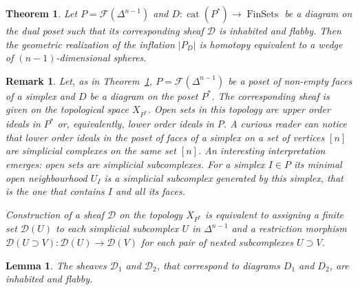 \documentclass[10pt,a4paper]{amsart}
\newtheorem{lem}{Lemma}
\newtheorem{thm}{Theorem}
\newtheorem{rem}{Remark}
\DeclareMathOperator{\FinSets}{FinSets}
\newcommand{\ca}[1]{\mathcal{#1}}
\DeclareMathOperator{\cat}{cat}
\begin{document}
\begin{thm}\label{thmSimplex}
Let $P=\ca{F}(\Delta^{n-1})$  and  $D\colon \cat(P^*)\to \FinSets$ be a diagram on the dual poset such that its corresponding sheaf $\ca{D}$ is inhabited  and  flabby. Then the geometric realization of the inflation $|P_D|$  is homotopy equivalent to a wedge of $(n-1)$-dimensional spheres.
\end{thm}

\begin{rem}\label{remOpenSubcomplexes}
Let, as in Theorem~\ref{thmSimplex}, $P=\ca{F}(\Delta^{n-1})$ be a poset of non-empty faces of a simplex  and  $D$ be a diagram on the poset $P^*$. The corresponding sheaf is given on the topological space $X_{P^*}$. Open sets in this topology are upper order ideals in $P^*$ or, equivalently, lower order ideals in $P$. A curious reader can notice that lower order ideals in the poset of faces of a simplex on a set of vertices $[n]$ are simplicial complexes on the same set $[n]$. An interesting interpretation emerges: open sets are simplicial subcomplexes. For a simplex $I\in P$ its minimal open neighbourhood $U_I$ is a simplicial subcomplex generated by this simplex, that is the one that contains $I$ and  all its faces.

Construction of a sheaf $\ca{D}$ on the topology $X_{P^*}$ is equivalent to assigning a finite set $\ca{D}(U)$ to each simplicial subcomplex $U$ in $\Delta^{n-1}$  and  a restriction morphism $\ca{D}(U\supset V)\colon \ca{D}(U)\to \ca{D}(V)$ for each pair of nested subcomplexes $U\supset V$.
\end{rem}

\begin{lem}\label{lemInhFlabby}
The sheaves $\ca{D}_1$ and $\ca{D}_2$, that correspond to diagrams $D_1$ and $D_2$, are inhabited and flabby.
\end{lem}
\end{document}

